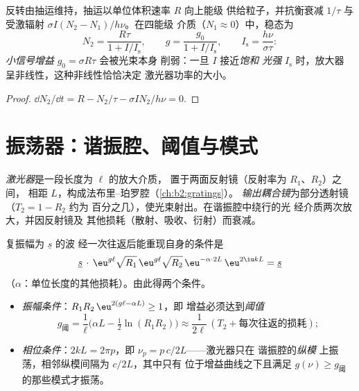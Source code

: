 \begin{proposition}[增益的饱和]\label{prop:b2:laser:saturation}
反转由抽运维持，抽运以单位体积速率 $R$ 向上能级
供给粒子，并抗衡衰减 $1/\tau$ 与
受激辐射 $\sigma I (N_2 - N_1)/h\nu$。在四能级
介质（$N_1 \approx 0$）中，稳态为
\[
N_2 = \frac{R\tau}{1 + I/I_{\text{s}}}, \qquad
g = \frac{g_0}{1 + I/I_{\text{s}}}, \qquad
I_{\text{s}} = \frac{h\nu}{\sigma\tau} :
\]
\emph{小信号增益} $g_0 = \sigma R\tau$ 会被光束本身
削弱：一旦 $I$ 接近\emph{饱和
光强} $I_{\text{s}}$ 时，放大器
呈非线性，这种非线性恰恰决定
激光器功率的大小。
\end{proposition}

\begin{proof}
$\dd N_2/\dd t = R - N_2/\tau - \sigma I N_2/h\nu = 0$.
\end{proof}

\section{振荡器：谐振腔、阈值与模式}

\begin{definition}[激光谐振腔]\label{def:b2:laser:cavity}
\emph{激光器}是一段长度为 $\ell$ 的放大介质，
置于两面反射镜（反射率为 $R_1$、$R_2$）之间，
相距 $L$，构成法布里–珀罗腔（\cref{ch:b2:gratings}）。
\emph{输出耦合镜}为部分透射镜（$T_2 = 1 - R_2$ 约为
百分之几），使光束射出。在谐振腔中绕行的光
经介质两次放大，并因反射镜及
其他损耗（散射、吸收、衍射）而衰减。
\end{definition}

\begin{theorem}[振荡条件]\label{thm:b2:laser:threshold}
复振幅为 $\underline s$ 的波
经一次往返后能重现自身的条件是
\[
\underline s\,\cdot\, \eu^{g\ell}\sqrt{R_1}\,\eu^{g\ell}\sqrt{R_2}\,
\eu^{-\alpha\cdot 2L}\,\eu^{2\iu kL} = \underline s
\]
（$\alpha$：单位长度的其他损耗）。由此得两个条件。
\begin{itemize}
\item \emph{振幅条件}：$R_1R_2\,\eu^{2(g\ell - \alpha L)} \ge 1$，即
      增益必须达到\emph{阈值}
      \[
      g_{\text{阈}} = \frac{1}{\ell}\Big(\alpha L - \tfrac12\ln(R_1R_2)\Big)
      \approx \frac{1}{2\ell}\,(T_2 + \text{每次往返的损耗}) ;
      \]
\item \emph{相位条件}：$2kL = 2\pi p$，即 $\nu_p = p\,c/2L$——激光器只在
      谐振腔的\emph{纵模}
上振荡，相邻纵模间隔为 $c/2L$，其中只有
      位于增益曲线之下且满足 $g(\nu) \ge g_{\text{阈}}$ 的那些模式才振荡。
\end{itemize}
\end{theorem}


